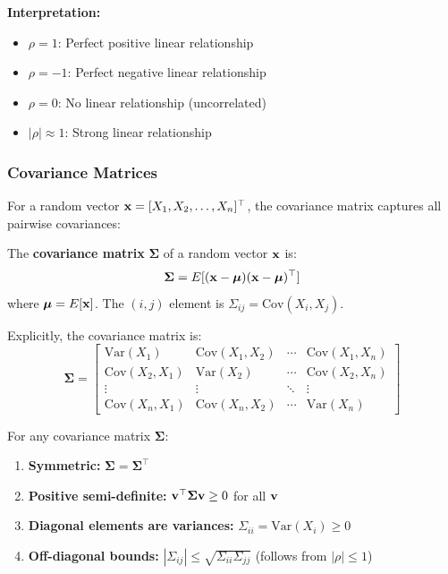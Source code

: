 \textbf{Interpretation:}
\begin{itemize}
    \item $\rho = 1$: Perfect positive linear relationship
    \item $\rho = -1$: Perfect negative linear relationship
    \item $\rho = 0$: No linear relationship (uncorrelated)
    \item $|\rho| \approx 1$: Strong linear relationship
\end{itemize}

\subsubsection{Covariance Matrices}

For a random vector $\mathbf{x} = [X_1, X_2, \ldots, X_n]^\top$, the covariance matrix captures all pairwise covariances:

\begin{definitionbox}[title=Definition: Covariance Matrix]
The \textbf{covariance matrix} $\boldsymbol{\Sigma}$ of a random vector $\mathbf{x}$ is:
\begin{equation}
\boldsymbol{\Sigma} = E[(\mathbf{x} - \boldsymbol{\mu})(\mathbf{x} - \boldsymbol{\mu})^\top]
\end{equation}
where $\boldsymbol{\mu} = E[\mathbf{x}]$. The $(i,j)$ element is $\Sigma_{ij} = \text{Cov}(X_i, X_j)$.
\end{definitionbox}

Explicitly, the covariance matrix is:
\begin{equation}
\boldsymbol{\Sigma} = \begin{bmatrix}
\text{Var}(X_1) & \text{Cov}(X_1, X_2) & \cdots & \text{Cov}(X_1, X_n) \\
\text{Cov}(X_2, X_1) & \text{Var}(X_2) & \cdots & \text{Cov}(X_2, X_n) \\
\vdots & \vdots & \ddots & \vdots \\
\text{Cov}(X_n, X_1) & \text{Cov}(X_n, X_2) & \cdots & \text{Var}(X_n)
\end{bmatrix}
\end{equation}

\begin{keyconceptbox}[title=Properties of Covariance Matrices]
For any covariance matrix $\boldsymbol{\Sigma}$:
\begin{enumerate}
    \item \textbf{Symmetric:} $\boldsymbol{\Sigma} = \boldsymbol{\Sigma}^\top$
    \item \textbf{Positive semi-definite:} $\mathbf{v}^\top \boldsymbol{\Sigma} \mathbf{v} \geq 0$ for all $\mathbf{v}$
    \item \textbf{Diagonal elements are variances:} $\Sigma_{ii} = \text{Var}(X_i) \geq 0$
    \item \textbf{Off-diagonal bounds:} $|\Sigma_{ij}| \leq \sqrt{\Sigma_{ii}\Sigma_{jj}}$ (follows from $|\rho| \leq 1$)
\end{enumerate}
\end{keyconceptbox}

